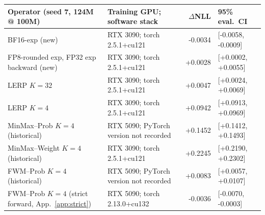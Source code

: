 \begin{tabular}{p{5.2cm}p{5.3cm}rl}
\toprule
Operator (seed 7, 124M @ 100M) & Training GPU; software stack & $\Delta$NLL & 95\% eval.\ CI \\
\midrule
BF16-exp (new) & RTX 3090; torch 2.5.1+cu121 & -0.0034 & [-0.0058, -0.0009] \\
FP8-rounded exp, FP32 exp backward (new) & RTX 3090; torch 2.5.1+cu121 & +0.0028 & [+0.0002, +0.0055] \\
LERP $K{=}32$ & RTX 3090; torch 2.5.1+cu121 & +0.0047 & [+0.0024, +0.0069] \\
LERP $K{=}4$ & RTX 3090; torch 2.5.1+cu121 & +0.0942 & [+0.0913, +0.0969] \\
MinMax--Prob $K{=}4$ (historical) & RTX 5090; PyTorch version not recorded & +0.1452 & [+0.1412, +0.1493] \\
MinMax--Weight $K{=}4$ (historical) & RTX 3090; torch 2.5.1+cu121 & +0.2245 & [+0.2190, +0.2302] \\
FWM--Prob $K{=}4$ (historical) & RTX 5090; PyTorch version not recorded & +0.0083 & [+0.0057, +0.0107] \\
FWM--Prob $K{=}4$ (strict forward, App.~\ref{app:strict}) & RTX 5090; torch 2.13.0+cu132 & -0.0036 & [-0.0070, -0.0003] \\
\bottomrule
\end{tabular}
